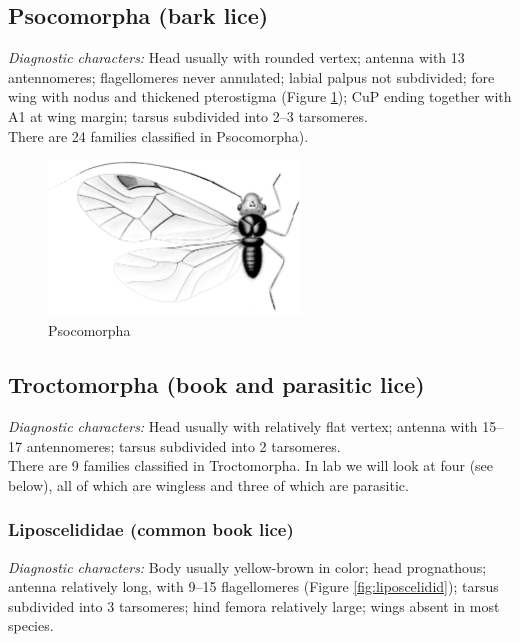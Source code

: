 \documentclass[letterpaper, 11pt]{article}
\begin{document}
\subsection{Psocomorpha (bark lice)}
\noindent{}\textit{Diagnostic characters:} Head usually with rounded vertex; antenna with 13 antennomeres; flagellomeres never annulated; labial palpus not subdivided; fore wing with nodus and thickened pterostigma (Figure \ref{fig:psocids}); CuP ending together with A1 at wing margin; tarsus subdivided into 2--3 tarsomeres.\\

\noindent{}There are 24 families classified in Psocomorpha).

\begin{figure}[ht!]
 \centering
 \includegraphics[width=0.6\textwidth]{psocomorphan.png}
 \caption{Psocomorpha \citep[][Fig. 19]{bhlitem37577}}
 \label{fig:psocids}
\end{figure}


\subsection{Troctomorpha (book and parasitic lice)}
\noindent{}\textit{Diagnostic characters:} Head usually with relatively flat vertex; antenna with 15--17 antennomeres; tarsus subdivided into 2 tarsomeres.\\

\noindent{}There are 9 families classified in Troctomorpha. In lab we will look at four (see below), all of which are wingless and three of which are parasitic.

\subsubsection{Liposcelididae (common book lice)}
\noindent{}\textit{Diagnostic characters:} Body usually yellow-brown in color; head prognathous; antenna relatively long, with 9--15 flagellomeres (Figure \ref{fig:liposcelidid}); tarsus subdivided into 3 tarsomeres; hind femora relatively large; wings absent in most species.\\
\end{document}
